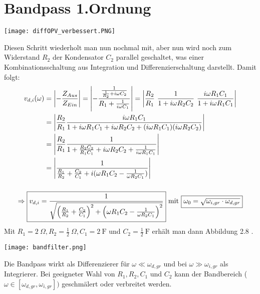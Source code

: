 \section*{Bandpass 1.Ordnung}
\begin{center}
    \texttt{[image: diffOPV\_verbessert.PNG]}
\end{center}
Diesen Schritt wiederholt man nun nochmal mit, aber nun wird noch zum Widerstand $R_2$ der Kondensator $C_2$ parallel geschaltet, was einer Kombinationsschaltung aus Integration und Differenzierschaltung darstellt. Damit folgt: %
\begin{gather}
    \begin{aligned}
        v_{d,i}(\omega) &= \abs{-\frac{Z_{Aus}}{Z_{Ein}}} = \abs{-\frac{\frac{1}{\frac{1}{R_2}+ i\omega C_2}}{R_1 + \frac{1}{i\omega C_1}}} = \abs{\frac{R_2}{R_1}~\frac{1}{1+i\omega R_2C_2}~\frac{i\omega R_1 C_1}{1+i\omega R_1C_1}}\\
        &=\abs{\frac{R_2}{R_1}\frac{i\omega R_1C_1}{1 + i\omega R_1C_1 + i\omega R_2C_2 + (i\omega R_1C_1)(i\omega R_2C_2)}}\\
        &=\abs{\frac{R_2}{R_1}\frac{1}{1 + \frac{R_2C_2}{R_1C_1} + i\omega R_2C_2 + \frac{1}{i\omega R_1C_1}}}\\
        &=\abs{\frac{1}{\frac{R_1}{R_2}+\frac{C_2}{C_1}+i(\omega R_1C_2 - \frac{1}{\omega R_2C_1})}}
    \end{aligned}\\[0.5cm]
    \Rightarrow \boxed{v_{d,i}=\frac{1}{\sqrt{\left(\frac{R_1}{R_2}+\frac{C_2}{C_1}\right)^2+\left(\omega R_1C_2 - \frac{1}{\omega R_2C_1}\right)^2}}}~\text{mit}~\boxed{\omega_0 = \sqrt{\omega_{i,gr}\cdot \omega_{d,gr}}}
\end{gather}
Mit $R_1 = 2~\Omega, R_2 = \frac{1}{2}~\Omega, C_1 = 2~\text{F}$ und $C_2 = \frac{1}{2}~\text{F}$ erhält man dann Abbildung 2.8 .
\begin{center}
    \texttt{[image: bandfilter.png]}
\end{center}
Die Bandpass wirkt als Differenzierer für $\omega \ll \omega_{d,gr}$ und bei $\omega \gg \omega_{i,gr}$ als Integrierer. Bei geeigneter Wahl von $R_1, R_2, C_1$ und $C_2$ kann der Bandbereich ($\omega \in [\omega_{d,gr},\omega_{i,gr}])$ geschmälert oder verbreitet werden. %
